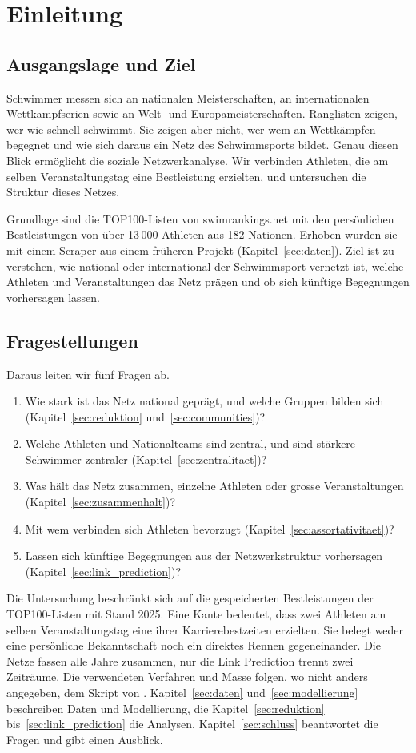 \section{Einleitung}
\label{sec:einleitung}

\subsection{Ausgangslage und Ziel}
Schwimmer messen sich an nationalen Meisterschaften, an internationalen
Wettkampfserien sowie an Welt- und Europameisterschaften. Ranglisten zeigen,
wer wie schnell schwimmt. Sie zeigen aber nicht, wer wem an Wettkämpfen
begegnet und wie sich daraus ein Netz des Schwimmsports bildet. Genau diesen
Blick ermöglicht die soziale Netzwerkanalyse. Wir verbinden Athleten, die am
selben Veranstaltungstag eine Bestleistung erzielten, und untersuchen die
Struktur dieses Netzes.

Grundlage sind die TOP100-Listen von swimrankings.net mit den persönlichen
Bestleistungen von über 13\,000 Athleten aus 182 Nationen. Erhoben wurden sie
mit einem Scraper aus einem früheren Projekt (Kapitel~\ref{sec:daten}). Ziel
ist zu verstehen, wie national oder international der Schwimmsport vernetzt
ist, welche Athleten und Veranstaltungen das Netz prägen und ob sich künftige
Begegnungen vorhersagen lassen.

\subsection{Fragestellungen}
Daraus leiten wir fünf Fragen ab.
\begin{enumerate}
  \item Wie stark ist das Netz national geprägt, und welche Gruppen bilden
  sich (Kapitel~\ref{sec:reduktion} und~\ref{sec:communities})?
  \item Welche Athleten und Nationalteams sind zentral, und sind stärkere
  Schwimmer zentraler (Kapitel~\ref{sec:zentralitaet})?
  \item Was hält das Netz zusammen, einzelne Athleten oder grosse
  Veranstaltungen (Kapitel~\ref{sec:zusammenhalt})?
  \item Mit wem verbinden sich Athleten bevorzugt
  (Kapitel~\ref{sec:assortativitaet})?
  \item Lassen sich künftige Begegnungen aus der Netzwerkstruktur vorhersagen
  (Kapitel~\ref{sec:link_prediction})?
\end{enumerate}

Die Untersuchung beschränkt sich auf die gespeicherten Bestleistungen der
TOP100-Listen mit Stand 2025. Eine Kante bedeutet, dass zwei Athleten am selben Veranstaltungstag eine ihrer Karrierebestzeiten erzielten. Sie belegt weder eine
persönliche Bekanntschaft noch ein direktes Rennen gegeneinander. Die Netze
fassen alle Jahre zusammen, nur die Link Prediction trennt zwei Zeiträume.
Die verwendeten Verfahren und Masse folgen, wo nicht anders angegeben, dem
Skript von \textcite{henninger2024}.
Kapitel~\ref{sec:daten} und~\ref{sec:modellierung} beschreiben Daten und
Modellierung, die Kapitel~\ref{sec:reduktion} bis~\ref{sec:link_prediction}
die Analysen. Kapitel~\ref{sec:schluss} beantwortet die Fragen und gibt einen
Ausblick.
